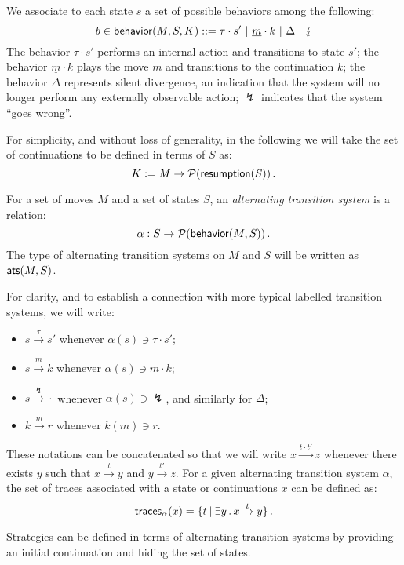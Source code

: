 We associate to each state $s$ a set of possible
behaviors among the following:
\[ b \in \kw{behavior}(M,S,K) ::=
	\tau \cdot s' \ |\
	\underline{m} \cdot k \ | \
	\Delta \ |\ 
	\lightning \]
The behavior $\tau \cdot s'$
performs an internal action and transitions to state $s'$;
the behavior $\underline{m} \cdot k$
plays the move $m$ and transitions to the continuation $k$;
the behavior $\Delta$ represents silent divergence,
an indication that the system will no longer perform
any externally observable action;
$\lightning$ indicates that the system ``goes wrong''.

For simplicity, and without loss of generality,
in the following we will take the set of continuations
to be defined in terms of $S$ as:
\[ K := M \rightarrow \mathcal{P}( \mathsf{resumption} (S)) \,. \]

\begin{definition}[Alternating transition system]
For a set of moves $M$ and a set of states $S$,
an \emph{alternating transition system} is a relation:
\[
  \alpha : S \rightarrow \mathcal{P}( \mathsf{behavior} (M, S)) \,.
\]
The type of alternating transition systems on $M$ and $S$
will be written as $ \mathsf{ats} (M, S)$.
\end{definition}

For clarity,
and to establish a connection with more typical
labelled transition systems,
we will write:
\begin{itemize}
\item $s \xrightarrow{\tau} s'$ whenever $\alpha(s) \ni \tau \cdot s'$;
\item $s \xrightarrow{\underline{m}} k$
	whenever $\alpha(s) \ni \underline{m} \cdot k$;
\item $s \xrightarrow{\lightning} {\cdot}$
	whenever $\alpha(s) \ni \lightning$,
	and similarly for $\Delta$;
\item $k \xrightarrow{m} r$ whenever $k(m) \ni r$.
\end{itemize}
These notations can be concatenated so that
we will write $x \xrightarrow{t \cdot t'} z$
whenever there exists $y$ such that $x \xrightarrow{t} y$ and
$y \xrightarrow{t'} z$.
For a given alternating transition system $\alpha$,
the set of traces associated with a state or continuations $x$
can be defined as:
\[
     \mathsf{traces} _\alpha(x) =
	\{ t \:|\: \exists y \,.\, x \xrightarrow{t} y \} \,.
\]

Strategies can be defined in terms of alternating transition systems
by providing an initial continuation and hiding the set of states.


